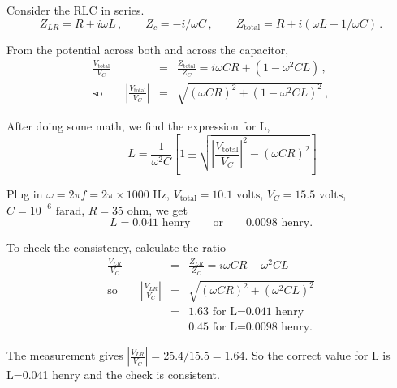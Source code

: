 \documentclass[makesolutionspdf]{esg8022pset}
\begin{document}
\begin{solution}
  Consider the RLC in series.  
  \begin{equation}
  Z_{LR}=R+i\omega L\,,\qquad Z_c=-i/\omega C\,,\qquad
  Z_{\textrm{total}}=R+i(\omega L-1/\omega C)\,.
  \end{equation}

  From the potential across both and across the capacitor,
  \begin{eqnarray}
  \frac{V_{\textrm{total}}}{V_C}&=&\frac{Z_{\textrm{total}}}{Z_C}=i\omega
  CR+(1-\omega^2 CL)\,,\\
  \textrm{so}\qquad \left| \frac{V_{\textrm{total}}}{V_C}\right| &=&
  \sqrt{(\omega CR)^2+(1-\omega^2 CL)^2}\,,
  \end{eqnarray}

  After doing some math, we find the expression for L,
  \begin{equation}
  \qquad L = \frac{1}{\omega^2 C}\left[
  1\pm \sqrt{\left|\frac{V_{\textrm{total}}}{V_C}\right|^2-(\omega CR)^2}
  \right]
  \end{equation}

  Plug in $\omega=2\pi f=2\pi\times 1000\textrm{ Hz}$,
  $V_{\textrm{total}}=10.1\textrm{ volts}$, $V_C=15.5\textrm{ volts}$,
  $C=10^{-6}\textrm{ farad}$, $R=35\textrm{ ohm}$, we get 
  \[ L= 0.041 \textrm{ henry}\qquad\textrm{or}\qquad 0.0098\textrm{ henry}.\]

  To check the consistency, calculate the ratio
  \begin{eqnarray}
  \frac{V_{LR}}{V_C}&=&\frac{Z_{LR}}{Z_C}=i\omega CR-\omega^2 CL\\
  \textrm{so}\qquad \left|\frac{V_{LR}}{V_C}\right| &=& \sqrt{(\omega
  CR)^2+(\omega^2 CL)^2}\\
  &=& 1.63 \textrm{ for L=0.041 henry}\nonumber\\
  & & 0.45\textrm{ for L=0.0098 henry}.
  \end{eqnarray}

  The measurement gives $\left|\frac{V_{LR}}{V_C}\right| =
  25.4/15.5=1.64$.  So the correct value for L is L=0.041 henry and the
  check is consistent.
\end{solution}
\end{document}
